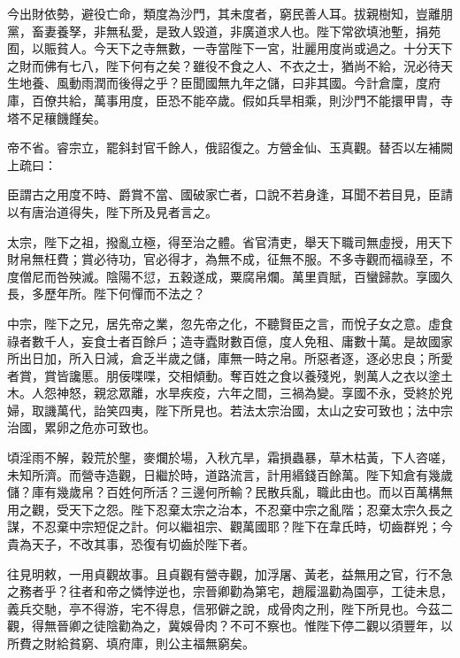 \begin{pinyinscope}
 今出財依勢，避役亡命，類度為沙門，其未度者，窮民善人耳。拔親樹知，豈離朋黨，畜妻養孥，非無私愛，是致人毀道，非廣道求人也。陛下常欲填池塹，捐苑囿，以賑貧人。今天下之寺無數，一寺當陛下一宮，壯麗用度尚或過之。十分天下之財而佛有七八，陛下何有之矣？雖役不食之人、不衣之士，猶尚不給，況必待天生地養、風動雨潤而後得之乎？臣聞國無九年之儲，曰非其國。今計倉廩，度府庫，百僚共給，萬事用度，臣恐不能卒歲。假如兵旱相乘，則沙門不能擐甲胄，寺塔不足穰饑饉矣。



 帝不省。睿宗立，罷斜封官千餘人，俄詔復之。方營金仙、玉真觀。替否以左補闕上疏曰：



 臣謂古之用度不時、爵賞不當、國破家亡者，口說不若身逢，耳聞不若目見，臣請以有唐治道得失，陛下所及見者言之。



 太宗，陛下之祖，撥亂立極，得至治之體。省官清吏，舉天下職司無虛授，用天下財帛無枉費；賞必待功，官必得才，為無不成，征無不服。不多寺觀而福祿至，不度僧尼而咎殃滅。陰陽不愆，五穀遂成，粟腐帛爛。萬里貢賦，百蠻歸款。享國久長，多歷年所。陛下何憚而不法之？



 中宗，陛下之兄，居先帝之業，忽先帝之化，不聽賢臣之言，而悅子女之意。虛食祿者數千人，妄食士者百餘戶；造寺蠹財數百億，度人免租、庸數十萬。是故國家所出日加，所入日減，倉乏半歲之儲，庫無一時之帛。所惡者逐，逐必忠良；所愛者賞，賞皆讒慝。朋佞喋喋，交相傾動。奪百姓之食以養殘兇，剝萬人之衣以塗土木。人怨神怒，親忿眾離，水旱疾疫，六年之間，三禍為變。享國不永，受終於兇婦，取譏萬代，詒笑四夷，陛下所見也。若法太宗治國，太山之安可致也；法中宗治國，累卵之危亦可致也。



 頃淫雨不解，穀荒於壟，麥爛於場，入秋亢旱，霜損蟲暴，草木枯黃，下人咨嗟，未知所濟。而營寺造觀，日繼於時，道路流言，計用緡錢百餘萬。陛下知倉有幾歲儲？庫有幾歲帛？百姓何所活？三邊何所輸？民散兵亂，職此由也。而以百萬構無用之觀，受天下之怨。陛下忍棄太宗之治本，不忍棄中宗之亂階；忍棄太宗久長之謀，不忍棄中宗短促之計。何以繼祖宗、觀萬國耶？陛下在韋氏時，切齒群兇；今貴為天子，不改其事，恐復有切齒於陛下者。



 往見明敕，一用貞觀故事。且貞觀有營寺觀，加浮屠、黃老，益無用之官，行不急之務者乎？往者和帝之憐悖逆也，宗晉卿勸為第宅，趙履溫勸為園亭，工徒未息，義兵交馳，亭不得游，宅不得息，信邪僻之說，成骨肉之刑，陛下所見也。今茲二觀，得無晉卿之徒陰勸為之，冀娛骨肉？不可不察也。惟陛下停二觀以須豐年，以所費之財給貧窮、填府庫，則公主福無窮矣。




\end{pinyinscope}

